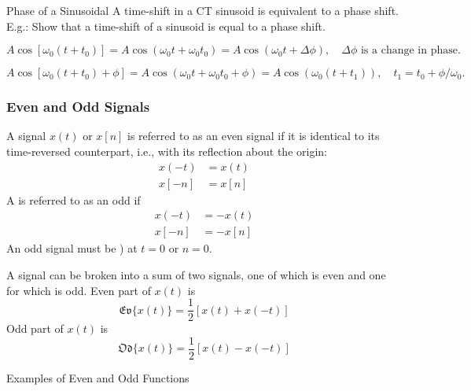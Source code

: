 \begin{frame}[plain]{Phase of a Sinusoidal}
    A time-shift in a CT sinusoid is equivalent to a phase shift.\\
    E.g.: Show that a time-shift of a sinusoid is equal to a phase shift.
    {
        \begin{equation*}
            A\cos[\omega_0(t + t_0)] = A\cos(\omega_0t + \omega_0t_0) = A\cos(\omega_0t + \Delta\phi),\quad \Delta\phi \text{ is a change in phase}.
        \end{equation*}

        \begin{equation*}
            A\cos[\omega_0(t + t_0) + \phi] = A\cos(\omega_0t + \omega_0t_0 + \phi) = A\cos(\omega_0(t + t_1)),\quad t_1 = t_0 + \phi/\omega_0.
        \end{equation*}
    }
\end{frame}

\begin{frame}[t]
\frametitle{Even and Odd Signals}
    A signal $x(t)$ or $x[n]$ is referred to as an \alert{even} signal if it is identical to its time-reversed counterpart, i.e., with its reflection about the origin:
    \begin{align*}
        x(-t) &= x(t)\\
        x[-n] &= x[n]
    \end{align*}
    A is referred to as an \alert{odd} if
    \begin{align*}
        x(-t) &= -x(t)\\
        x[-n] &= -x[n]
    \end{align*}
    An odd signal must be ) at $t=0$ or $n=0$.

    A signal can be broken into a sum of two signals, one of which is even and one for which is odd.
    Even part of $x(t)$ is
    \begin{equation*}
        \mathfrak{Ev}\{x(t)\} = \frac{1}{2}[x(t)+x(-t)]
    \end{equation*}
    Odd part of $x(t)$ is
    \begin{equation*}
        \mathfrak{Od}\{x(t)\} = \frac{1}{2}[x(t)-x(-t)]
    \end{equation*}
\end{frame}

\begin{frame}{Examples of Even and Odd Functions}
    \centering
    
\end{frame}


